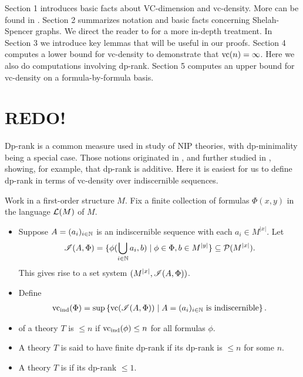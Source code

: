 \documentclass{amsart}
\begin{document}
Section 1 introduces basic facts about VC-dimension and vc-density.
More can be found in \cite{density}.
Section 2 summarizes notation and basic facts concerning Shelah-Spencer graphs.
We direct the reader to \cite{laskowski} for a more in-depth treatment.
In Section 3 we introduce key lemmas that will be useful in our proofs.
Section 4 computes a lower bound for vc-density to demonstrate that $\operatorname{vc}(n) = \infty$.
Here we also do computations involving dp-rank.
Section 5 computes an upper bound for vc-density on a formula-by-formula basis.



\section{REDO!}

Dp-rank is a common measure used in study of NIP theories, with dp-minimality being a special case.
Those notions originated in \cite{shelah_dp}, and further studied in \cite{dp_add}, showing, for example, that dp-rank is additive.
Here it is easiest for us to define dp-rank in terms of vc-density over indiscernible sequences.

\begin{Definition} \label{def_dp}
  Work in a first-order structure $M$.
  Fix a finite collection of formulas $\Phi(x, y)$ in the language $\mathcal L(M)$ of $M$.
  \begin{itemize}
  \item Suppose $A = (a_i)_{i \in \mathbb{N}}$ is an indiscernible sequence with each $a_i \in M^{|x|}$.
    Let
    \begin{align*}
      \mathscr I(A, \Phi) = \{\phi(\bigcup_{i \in \mathbb{N}} a_i, b) \mid \phi \in \Phi, b \in M^{|y|}\} \subseteq \mathcal P(M^{|x|}).     
    \end{align*}
    This gives rise to a set system $(M^{|x|}, \mathscr I(A, \Phi))$.
  \item Define
    \begin{align*}
      \operatorname{vc}_{\operatorname{ind}}(\Phi) = \sup \left\{\operatorname{vc}(\mathscr I(A, \Phi)) \mid A = (a_i)_{i \in \mathbb{N}} \text{ is indiscernible}\right\}.
    \end{align*}
  \item {} of a theory $T$ is $\leq n$ if $\operatorname{vc}_{\operatorname{ind}}(\phi) \leq n$ for all formulas $\phi$.
  \item A theory $T$ is said to have finite dp-rank if its dp-rank is $\leq n$ for some $n$.
  \item A theory $T$ is  if its dp-rank $\leq 1$.
  \end{itemize}
\end{Definition}
\end{document}
